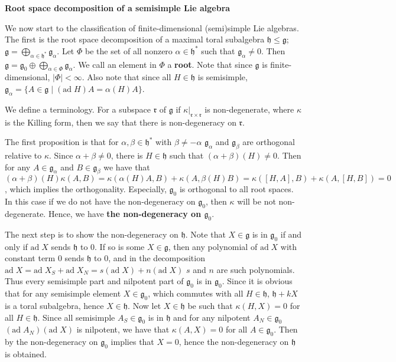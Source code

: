 \documentclass{article}
\newcommand{\SBar}{\;|\;}
\newcommand{\lie}[1]{\mathfrak{#1}}
\newcommand{\ad}[1]{\mathrm{ad}\; #1}
\begin{document}
\newpage

\textbf{Root space decomposition of a semisimple Lie algebra}

We now start to the classification of finite-dimensional (semi)simple Lie algebras.
The first is the root space decomposition of a maximal toral subalgebra $\lie{h} \le \lie{g}$; $\lie{g} = \bigoplus_{\alpha \in \lie{h}^*} \lie{g}_\alpha$.
Let $\Phi$ be the set of all nonzero $\alpha \in \lie{h}^*$ such that $\lie{g}_\alpha \ne 0$.
Then $\lie{g} = \lie{g}_0 \oplus \bigoplus_{\alpha \in \Phi} \lie{g}_\alpha$.
We call an element in $\Phi$ a \textbf{root}.
Note that since $\lie{g}$ is finite-dimensional, $|\Phi| < \infty$.
Also note that since all $H \in \lie{h}$ is semisimple, $\lie{g}_\alpha = \{A \in \lie{g} \SBar (\ad{H})A = \alpha(H)A\}$.

We define a terminology.
For a subspace $\lie{r}$ of $\lie{g}$ if $\kappa|_{\lie{r} \times \lie{r}}$ is non-degenerate, where $\kappa$ is the Killing form, then we say that there is non-degeneracy on $\lie{r}$.

The first proposition is that for $\alpha, \beta \in \lie{h}^*$ with $\beta \ne -\alpha$ $\lie{g}_\alpha$ and $\lie{g}_\beta$ are orthogonal relative to $\kappa$.
Since $\alpha + \beta \ne 0$, there is $H \in \lie{h}$ such that $(\alpha + \beta)(H) \ne 0$.
Then for any $A \in \lie{g}_\alpha$ and $B \in \lie{g}_\beta$ we have that $(\alpha + \beta)(H) \kappa(A, B) = \kappa(\alpha(H) A, B) + \kappa(A, \beta(H) B) = \kappa([H, A], B) + \kappa(A, [H, B]) = 0$, which implies the orthogonality.
Especially, $\lie{g}_0$ is orthogonal to all root spaces.
In this case if we do not have the non-degeneracy on $\lie{g}_0$, then $\kappa$ will be not non-degenerate.
Hence, we have \textbf{the non-degeneracy on $\lie{g}_0$}.

The next step is to show the non-degeneracy on $\lie{h}$.
Note that $X \in \lie{g}$ is in $\lie{g}_0$ if and only if $\ad{X}$ sends $\lie{h}$ to 0.
If so is some $X \in \lie{g}$, then any polynomial of $\ad{X}$ with constant term 0 sends $\lie{h}$ to 0, and in the decomposition $\ad{X} = \ad{X_S} + \ad{X_N} = s(\ad{X}) + n(\ad{X})$ $s$ and $n$ are such polynomials.
Thus every semisimple part and nilpotent part of $\lie{g}_0$ is in $\lie{g}_0$.
Since it is obvious that for any semisimple element $X \in \lie{g}_0$, which commutes with all $H \in \lie{h}$, $\lie{h} + kX$ is a toral subalgebra, hence $X \in \lie{h}$.
Now let $X \in \lie{h}$ be such that $\kappa(H, X) = 0$ for all $H \in \lie{h}$.
Since all semisimple $A_S \in \lie{g}_0$ is in $\lie{h}$ and for any nilpotent $A_N \in \lie{g}_0$ $(\ad{A_N})(\ad{X})$ is nilpotent, we have that $\kappa(A, X) = 0$ for all $A \in \lie{g}_0$.
Then by the non-degeneracy on $\lie{g}_0$ implies that $X = 0$, hence the non-degeneracy on $\lie{h}$ is obtained.
\end{document}
